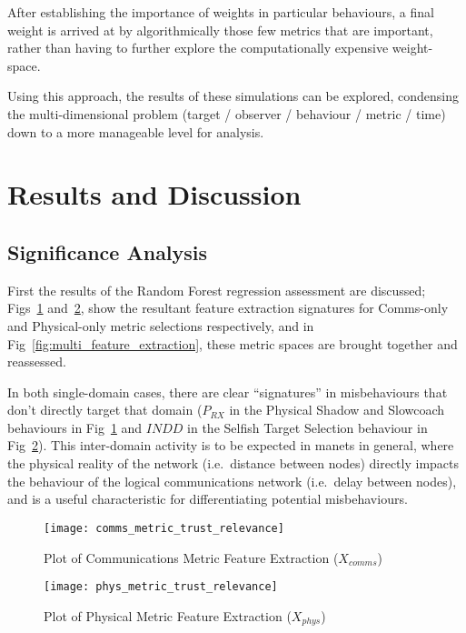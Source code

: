 After establishing the importance of weights in particular behaviours, a final weight is arrived at by algorithmically those few metrics that are important, rather than having to further explore the computationally expensive weight-space.

Using this approach, the results of these simulations can be explored, condensing the multi-dimensional problem (target / observer / behaviour / metric / time) down to a more manageable level for analysis.

\section{Results and Discussion}

\subsection{Significance Analysis}

First the results of the Random Forest regression assessment are discussed; Figs~\ref{fig:comms_feature_extraction} and~\ref{fig:phys_feature_extraction}, show the resultant feature extraction signatures for Comms-only and Physical-only metric selections respectively, and in Fig~\ref{fig:multi_feature_extraction}, these metric spaces are brought together and reassessed.

In both single-domain cases, there are clear ``signatures'' in misbehaviours that don't directly target that domain ($P_{RX}$ in the Physical Shadow and Slowcoach behaviours in Fig~\ref{fig:comms_feature_extraction} and $INDD$ in the Selfish Target Selection behaviour in Fig~\ref{fig:phys_feature_extraction}).
This inter-domain activity is to be expected in \glspl{manet} in general, where the physical reality of the network (i.e.\ distance between nodes) directly impacts the behaviour of the logical communications network (i.e.\ delay between nodes), and is a useful characteristic for differentiating potential misbehaviours.



\begin{figure}[h!]
	\centering
  \texttt{[image: comms\_metric\_trust\_relevance]}
	\caption{Plot of Communications Metric Feature Extraction ($X_{comms}$)}
	\label{fig:comms_feature_extraction}
\end{figure}

\begin{figure}[h!]
	\centering
  \texttt{[image: phys\_metric\_trust\_relevance]}
  \caption{Plot of Physical Metric Feature Extraction ($X_{phys}$)}
	\label{fig:phys_feature_extraction}
\end{figure}


